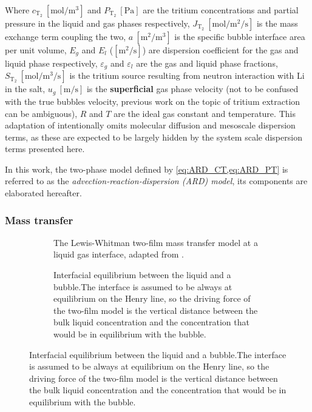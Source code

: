 \documentclass[a4paper,11pt,oneside]{report}
\newcommand{\PT}{\ensuremath{P_\mathrm{T_2}}}
\newcommand{\CT}{\ensuremath{c_\mathrm{T_2}}}
\newcommand{\JT}{\ensuremath{J_\mathrm{T_2}}}
\newcommand{\ST}{\ensuremath{S_\mathrm{T_2}}}
\begin{document}
Where $\CT \ \mathrm{[mol/m^3]}$ and $\PT  \:\mathrm{[Pa]}$ are the tritium concentrations and partial pressure in the liquid and gas phases respectively, $\JT \:\mathrm{[mol/m^2/s]}$ is the mass exchange term coupling the two, $a \:\mathrm{[m^2/m^3]}$ is the specific bubble interface area per unit volume, $E_g$ and $E_l$ ($\mathrm{[m^2/s]}$) are dispersion coefficient for the gas and liquid phase respectively, $\varepsilon_g$ and $\varepsilon_l$ are the gas and liquid phase fractions, $\ST \ \mathrm{[mol/m^3/s]}$ is the tritium source resulting from neutron interaction with Li in the salt, $u_g \: \mathrm{[m/s]}$ is the \textbf{superficial} gas phase velocity (not to be confused with the true bubbles velocity, previous work on the topic of tritium extraction can be ambiguous), $R$ and $T$ are the ideal gas constant and temperature. This adaptation of \cite{gray_derivation_1975} intentionally omits molecular diffusion and mesoscale dispersion terms, as these are expected to be largely hidden by the system scale dispersion terms presented here.

In this work, the two-phase model defined by \cref{eq:ARD_CT,eq:ARD_PT} is referred to as the \textit{advection-reaction-dispersion (ARD) model}, its components are elaborated hereafter.

\subsubsection{Mass transfer}

\begin{figure}[ht]
    \begin{subfigure}[t]{0.48\linewidth}
        \centering
        \resizebox{\linewidth}{!}{}
        \caption{The Lewis-Whitman two-film mass transfer model at a liquid gas interface, adapted from \textcite{evans_physics_2026}.}
        \label{fig:two_film_model}
    \end{subfigure}
    \hspace{1 em}
    \begin{subfigure}[t]{0.48\linewidth}
      \centering
      \resizebox{\linewidth}{!}{}
      \caption{Interfacial equilibrium between the liquid and a bubble.The interface is assumed to be always at equilibrium on the Henry line, so the driving force of the two-film model is the vertical distance between the bulk liquid concentration and the concentration that would be in equilibrium with the bubble.}
      \label{fig:equilibrium}
    \end{subfigure}
\end{figure}
\end{document}
